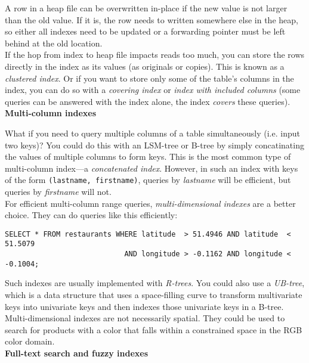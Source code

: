 \documentclass[12pt, titlepage]{article}
\begin{document}
A row in a heap file can be overwritten in-place if the new value is not larger than the old value. If it is, the row needs to written somewhere else in the heap, so either all indexes need to be updated or a forwarding pointer must be left behind at the old location. \\

If the hop from index to heap file impacts reads too much, you can store the rows directly in the index as its values (as originals or copies). This is known as a \textit{clustered index}. Or if you want to store only some of the table's columns in the index, you can do so with a \textit{covering index} or \textit{index with included columns} (some queries can be answered with the index alone, the index \textit{covers} these queries). \\

\textbf{Multi-column indexes} \medskip

What if you need to query multiple columns of a table simultaneously (i.e. input two keys)? You could do this with an LSM-tree or B-tree by simply concatinating the values of multiple columns to form keys. This is the most common type of multi-column index---a \textit{concatenated index}. However, in such an index with keys of the form \texttt{(lastname, firstname)}, queries by \textit{lastname} will be efficient, but queries by \textit{firstname} will not. \\

For efficient multi-column range queries, \textit{multi-dimensional indexes} are a better choice. They can do queries like this efficiently:

\begin{verbatim}
SELECT * FROM restaurants WHERE latitude  > 51.4946 AND latitude  < 51.5079
                            AND longitude > -0.1162 AND longitude < -0.1004;
\end{verbatim}

Such indexes are usually implemented with \textit{R-trees}. You could also use a \textit{UB-tree}, which is a data structure that uses a space-filling curve to transform multivariate keys into univariate keys and then indexes those univariate keys in a B-tree. Multi-dimensional indexes are not necessarily spatial. They could be used to search for products with a color that falls within a constrained space in the RGB color domain. \\

\textbf{Full-text search and fuzzy indexes} \medskip
\end{document}
